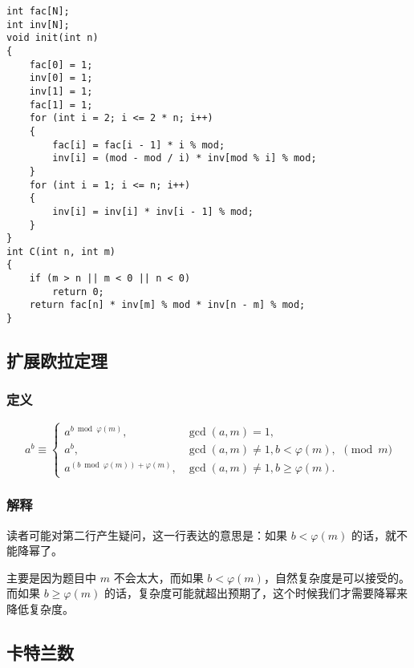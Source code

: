 \documentclass[]{article}
\begin{document}
\begin{verbatim}
int fac[N];
int inv[N];
void init(int n)
{
    fac[0] = 1;
    inv[0] = 1;
    inv[1] = 1;
    fac[1] = 1;
    for (int i = 2; i <= 2 * n; i++)
    {
        fac[i] = fac[i - 1] * i % mod;
        inv[i] = (mod - mod / i) * inv[mod % i] % mod;
    }
    for (int i = 1; i <= n; i++)
    {
        inv[i] = inv[i] * inv[i - 1] % mod;
    }
}
int C(int n, int m)
{
    if (m > n || m < 0 || n < 0)
        return 0;
    return fac[n] * inv[m] % mod * inv[n - m] % mod;
}
\end{verbatim}

\hypertarget{ux6269ux5c55ux6b27ux62c9ux5b9aux7406}{%
\subsection{扩展欧拉定理}\label{ux6269ux5c55ux6b27ux62c9ux5b9aux7406}}

\hypertarget{ux5b9aux4e49}{%
\subsubsection{定义}\label{ux5b9aux4e49}}

\[
a^b \equiv \begin{cases}
  a^{b \bmod \varphi(m)},                &\gcd(a,m) =  1,                   \\
  a^b,                                   &\gcd(a,m)\ne 1, b <   \varphi(m), \\
  a^{(b \bmod \varphi(m)) + \varphi(m)}, &\gcd(a,m)\ne 1, b \ge \varphi(m).
\end{cases} \pmod m
\]

\hypertarget{ux89e3ux91ca}{%
\subsubsection{解释}\label{ux89e3ux91ca}}

读者可能对第二行产生疑问，这一行表达的意思是：如果 \(b < \varphi(m)\)
的话，就不能降幂了。

主要是因为题目中 \(m\) 不会太大，而如果
\(b < \varphi(m)\)，自然复杂度是可以接受的。而如果 \(b \ge \varphi(m)\)
的话，复杂度可能就超出预期了，这个时候我们才需要降幂来降低复杂度。

\hypertarget{ux5361ux7279ux5170ux6570}{%
\subsection{卡特兰数}\label{ux5361ux7279ux5170ux6570}}
\end{document}
